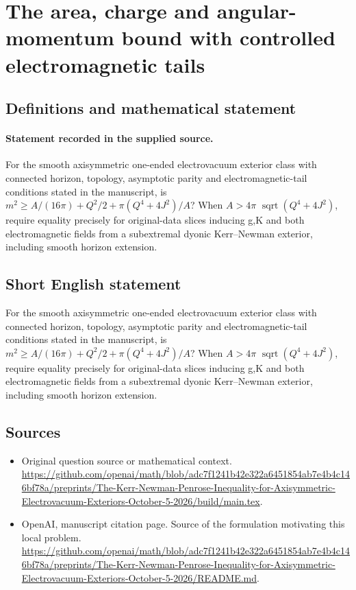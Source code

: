 \documentclass[11pt]{article}
\begin{document}
\section*{The area, charge and angular-momentum bound with controlled electromagnetic tails}\label{30007229}
\subsection{Definitions and mathematical statement}
\paragraph{Statement recorded in the supplied source.}
For the smooth axisymmetric one-ended electrovacuum exterior class with connected horizon, topology, asymptotic parity and electromagnetic-tail conditions stated in the manuscript, is $m^2\geq A/(16\pi )+Q^2/2+\pi (Q^4+4J^2)/A$? When $A>4\pi $ $\operatorname{sqrt}(Q^4+4J^2)$, require equality precisely for original-data slices inducing g,K and both electromagnetic fields from a subextremal dyonic Kerr–Newman exterior, including smooth horizon extension.
\subsection{Short English statement}
For the smooth axisymmetric one-ended electrovacuum exterior class with connected horizon, topology, asymptotic parity and electromagnetic-tail conditions stated in the manuscript, is $m^2\geq A/(16\pi )+Q^2/2+\pi (Q^4+4J^2)/A$? When $A>4\pi $ $\operatorname{sqrt}(Q^4+4J^2)$, require equality precisely for original-data slices inducing g,K and both electromagnetic fields from a subextremal dyonic Kerr–Newman exterior, including smooth horizon extension.
\subsection{Sources}
\begin{itemize}
\item[S1] Original question source or mathematical context.
\url{https://github.com/openai/math/blob/adc7f1241b42e322a6451854ab7e4b4c146bf78a/preprints/The-Kerr-Newman-Penrose-Inequality-for-Axisymmetric-Electrovacuum-Exteriors-October-5-2026/build/main.tex}.
\item[S2] OpenAI, manuscript citation page. Source of the formulation motivating this local problem.
\url{https://github.com/openai/math/blob/adc7f1241b42e322a6451854ab7e4b4c146bf78a/preprints/The-Kerr-Newman-Penrose-Inequality-for-Axisymmetric-Electrovacuum-Exteriors-October-5-2026/README.md}.
\end{itemize}
\end{document}
